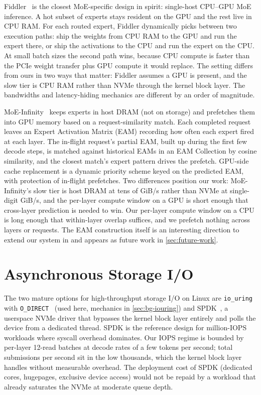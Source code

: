 Fiddler~\cite{kamahori2024fiddler} is the closest MoE-specific design in spirit: single-host CPU--GPU MoE inference.
A hot subset of experts stays resident on the GPU and the rest live in CPU RAM.
For each routed expert, Fiddler dynamically picks between two execution paths: ship the weights from CPU RAM to the GPU and run the expert there, or ship the activations to the CPU and run the expert on the CPU.
At small batch sizes the second path wins, because CPU compute is faster than the PCIe weight transfer plus GPU compute it would replace.
The setting differs from ours in two ways that matter: Fiddler assumes a GPU is present, and the slow tier is CPU RAM rather than NVMe through the kernel block layer.
The bandwidths and latency-hiding mechanics are different by an order of magnitude.

MoE-Infinity~\cite{xue2024moeinfinity} keeps experts in host DRAM (not on storage) and prefetches them into GPU memory based on a request-similarity match.
Each completed request leaves an Expert Activation Matrix (EAM) recording how often each expert fired at each layer.
The in-flight request's partial EAM, built up during the first few decode steps, is matched against historical EAMs in an EAM Collection by cosine similarity, and the closest match's expert pattern drives the prefetch.
GPU-side cache replacement is a dynamic priority scheme keyed on the predicted EAM, with protection of in-flight prefetches.
Two differences position our work: MoE-Infinity's slow tier is host DRAM at tens of GiB/s rather than NVMe at single-digit GiB/s, and the per-layer compute window on a GPU is short enough that cross-layer prediction is needed to win.
Our per-layer compute window on a CPU is long enough that within-layer overlap suffices, and we prefetch nothing across layers or requests.
The EAM construction itself is an interesting direction to extend our system in and appears as future work in \autoref{sec:future-work}.


\section{Asynchronous Storage I/O}\label{sec:rw-iouring}

The two mature options for high-throughput storage I/O on Linux are \texttt{io\_uring} with \texttt{O\_DIRECT}~\cite{axboe2019iouring,open_man} (used here, mechanics in \autoref{sec:bg-iouring}) and SPDK~\cite{spdk}, a userspace NVMe driver that bypasses the kernel block layer entirely and polls the device from a dedicated thread.
SPDK is the reference design for million-IOPS workloads where syscall overhead dominates.
Our IOPS regime is bounded by per-layer 12-read batches at decode rates of a few tokens per second; total submissions per second sit in the low thousands, which the kernel block layer handles without measurable overhead.
The deployment cost of SPDK (dedicated cores, hugepages, exclusive device access) would not be repaid by a workload that already saturates the NVMe at moderate queue depth.


